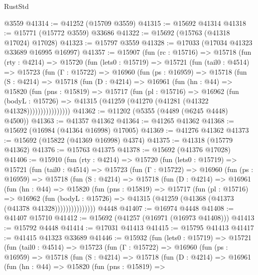\begin{lexlean}{RustStd}
\begin{coremodule}
    @3559
@41314 := @41252 (@15709 @3559)
@41315 := @15692 @41314
@41318 := @15771 (@15772 @3559) @33686
@41322 := @15692 (@15763 (@41318 @17024) @17028)
@41323 := @15797 @3559
@41328 := @17033 (@17034 @41323 @33689 @16995 @16997)
@41357 := @15907
    (fun (rc : @15716) =>
    @15718
      (fun (rty : @4214) =>
      @15720
        (fun (lets0 : @15719) =>
        @15721
          (fun (tail0 : @4514) =>
          @15723
            (fun (Γ : @15722) =>
            @16960
              (fun (ps : @16959) =>
              @15718
                (fun (S : @4214) =>
                @15718
                  (fun (D : @4214) =>
                  @16961
                    (fun (hn : @44) =>
                    @15820
                      (fun (pns : @15819) =>
                      @15717
                        (fun (pl : @15716) =>
                        @16962
                          (fun (bodyL : @15726) =>
                          @41315 (@41259 (@41270 (@41281 (@41322 @41328))))))))))))))))
@41362 := @11202 (@5355 (@4489 (@6245 @4448) @4500))
@41363 := @41357 @41362
@41364 := @41265 @41362
@41368 := @15692 (@16984 (@41364 @16998) @17005)
@41369 := @41276 @41362
@41373 := @15692 (@15822 (@41369 @16998) @4374)
@41375 := @41318 (@15779 @41362)
@41376 := @15763 @41375
@41378 := @15692 (@41376 @17028)
@41406 := @15910
    (fun (rty : @4214) =>
    @15720
      (fun (lets0 : @15719) =>
      @15721
        (fun (tail0 : @4514) =>
        @15723
          (fun (Γ : @15722) =>
          @16960
            (fun (ps : @16959) =>
            @15718
              (fun (S : @4214) =>
              @15718
                (fun (D : @4214) =>
                @16961
                  (fun (hn : @44) =>
                  @15820
                    (fun (pns : @15819) =>
                    @15717
                      (fun (pl : @15716) =>
                      @16962
                        (fun (bodyL : @15726) =>
                        @41315 (@41259 (@41368 (@41373 (@41378 @41328)))))))))))))))
    @4448
@41407 := @16974 @4448
@41408 := @41407 @15710
@41412 := @15692 (@41257 (@16971 (@16973 @41408)))
@41413 := @15792 @4448
@41414 := @17031 @41413
@41415 := @15795 @41413
@41417 := @41415 @41323 @33689
@41446 := @15932
    (fun (lets0 : @15719) =>
    @15721
      (fun (tail0 : @4514) =>
      @15723
        (fun (Γ : @15722) =>
        @16960
          (fun (ps : @16959) =>
          @15718
            (fun (S : @4214) =>
            @15718
              (fun (D : @4214) =>
              @16961
                (fun (hn : @44) =>
                @15820
                  (fun (pns : @15819) =>

\end{coremodule}
\end{lexlean}

